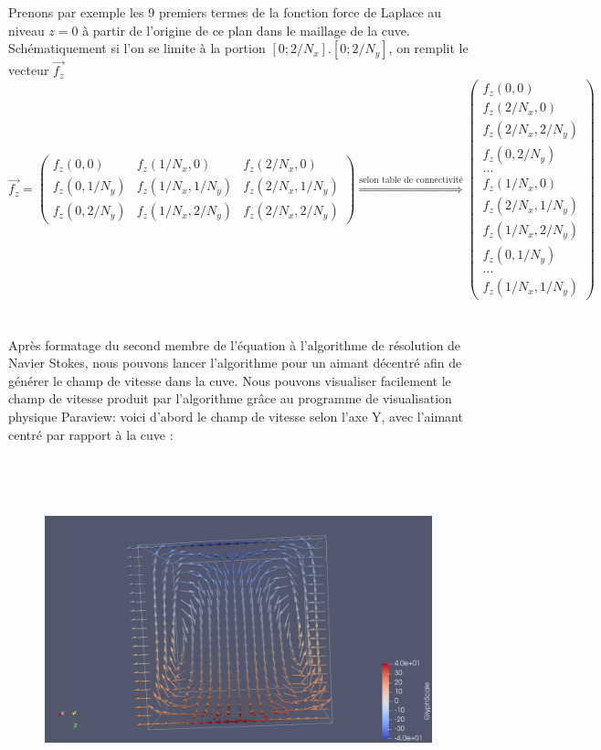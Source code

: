 \documentclass[a4paper,12pt,titlepage]{report}
\begin{document}
\begin{onehalfspace}
\newpage
Prenons par exemple les 9 premiers termes de la fonction force de Laplace au niveau $z=0$ à partir de l'origine de ce plan dans le maillage de la cuve. Schématiquement si l'on se limite à la portion $[0;2/N_x].[0;2/N_y]$, on remplit le vecteur $\vec{f_z}$
\\
\[
\vec{f_z}=
\left(
\begin{array}{ccc}
  f_z(0,0) & f_z(1/N_x,0) & f_z(2/N_x ,0)\\
  f_z(0,1/N_y) & f_z(1/N_x,1/N_y) & f_z(2/N_x ,1/N_y) \\
  f_z(0,2/N_y) &  f_z(1/N_x,2/N_y) & f_z(2/N_x,2/N_y )
\end{array}
\right) \overset{\text{selon table de connectivité}}{\Longrightarrow}
\left(
\begin{array}{ccc}
  f_z(0,0)     \\
  f_z(2/N_x ,0)      \\
      f_z(2/N_x,2/N_y )  \\
     f_z(0,2/N_y)\\ 
  ...\\
  f_z(1/N_x,0)\\
   f_z(2/N_x ,1/N_y)\\
   f_z(1/N_x,2/N_y) \\
   f_z(0,1/N_y)\\
   ... \\
    f_z(1/N_x,1/N_y)
\end{array}
\right)
\]
\\
\\
Après formatage du second membre de l'équation à l'algorithme de résolution de Navier Stokes, nous pouvons lancer l'algorithme pour un aimant décentré afin de générer le champ de vitesse dans la cuve. 
Nous pouvons visualiser facilement le champ de vitesse produit par l'algorithme grâce au programme de visualisation physique Paraview: 
voici d'abord le champ de vitesse selon l'axe Y, avec l'aimant centré par rapport à la cuve : 
\begin{figure}[!h]
\includegraphics[height = 10cm, keepaspectratio]{graphes/Champ_de_vitesse_selon_Y_centre.png} 

\end{figure}
\end{onehalfspace}
\end{document}
